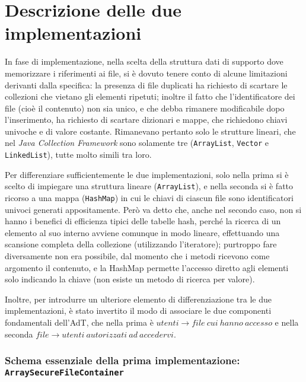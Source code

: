 \documentclass[a4paper,10pt]{article}
\begin{document}
  \vspace{-0.3cm}
  \section{ Descrizione delle due implementazioni }
  \vspace{-0.2cm}
 
 In fase di implementazione, nella scelta della struttura dati di supporto dove memorizzare i riferimenti ai file, si è dovuto tenere conto di alcune limitazioni derivanti dalla specifica: la presenza di file duplicati ha richiesto di scartare le collezioni che vietano gli elementi ripetuti; inoltre il fatto che l'identificatore dei file (cioè il contenuto) non sia unico, e che debba rimanere modificabile dopo l'inserimento, ha richiesto di scartare dizionari e mappe, che richiedono chiavi univoche e di valore costante. Rimanevano pertanto solo le strutture lineari, che nel \textit{Java Collection Framework} sono solamente tre (\texttt{ArrayList}, \texttt{Vector} e \texttt{LinkedList}), tutte molto simili tra loro.
 
 Per differenziare sufficientemente le due implementazioni, solo nella prima si è scelto di impiegare una struttura lineare (\texttt{ArrayList}), e nella seconda si è fatto ricorso a una mappa (\texttt{HashMap}) in cui le chiavi di ciascun file sono identificatori univoci generati appositamente. Però va detto che, anche nel secondo caso, non si hanno i benefici di efficienza tipici delle tabelle hash, perché la ricerca di un elemento al suo interno avviene comunque in modo lineare, effettuando una scansione completa della collezione (utilizzando l'iteratore); purtroppo fare diversamente non era possibile, dal momento che i metodi ricevono come argomento il contenuto, e la HashMap permette l'accesso diretto agli elementi solo indicando la chiave (non esiste un metodo di ricerca per valore).
 
 Inoltre, per introdurre un ulteriore elemento di differenziazione tra le due implementazioni, è stato invertito il modo di associare le due componenti fondamentali dell'AdT, che nella prima è $utenti \rightarrow file\ cui\ hanno\ accesso$ e nella seconda $file \rightarrow utenti\ autorizzati\ ad\ accedervi$.
 
 \vspace{-0.3cm}
 \subsubsection*{ Schema essenziale della prima implementazione: \texttt{ArraySecureFileContainer} }
 \vspace{-0.1cm}
 
\end{document}
